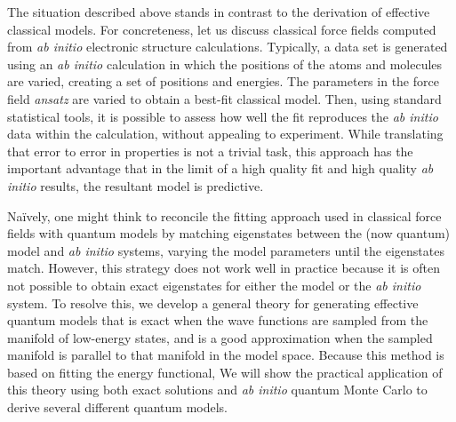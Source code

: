 The situation described above stands in contrast to the derivation of effective classical models. 
For concreteness, let us discuss classical force fields computed from {\it ab initio} electronic structure calculations. 
Typically, a data set is generated using an {\it ab initio} calculation in which the positions of the atoms and molecules are varied, creating a set of positions and energies. 
The parameters in the force field {\it ansatz} are varied to obtain a best-fit classical model.
Then, using standard statistical tools, it is possible to assess how well the fit reproduces the {\it ab initio} data within the calculation, without appealing to experiment. 
While translating that error to error in properties is not a trivial task, this approach has the important advantage that in the limit of a high quality fit and high quality {\it ab initio} results, the resultant model is predictive.

Na\"ively, one might think to reconcile the fitting approach used in classical force fields with quantum models by matching eigenstates between the (now quantum) model and {\it ab initio} systems, varying the model parameters until the eigenstates match. 
However, this strategy does not work well in practice because it is often not possible to obtain exact eigenstates for either the model or the {\it ab initio} system.
To resolve this, we develop a general theory for generating effective quantum models that is exact when the wave functions are sampled from the manifold of low-energy states, and is a good approximation when the sampled manifold is parallel to that manifold in the model space. 
Because this method is based on fitting the energy functional, 
We will show the practical application of this theory using both exact solutions and {\it ab initio} quantum Monte Carlo to derive several different quantum models.


